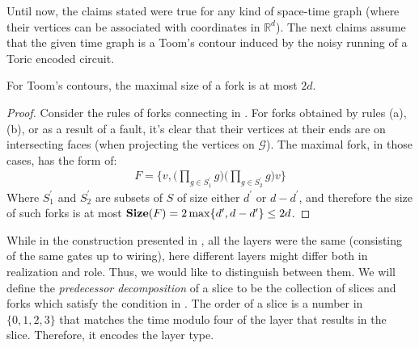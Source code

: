 
Until now, the claims stated were true for any kind of space-time graph (where their vertices can be associated with coordinates in $\mathbb{R}^{d}$). The next claims assume that the given time graph is a Toom's contour induced by the noisy running of a Toric encoded circuit.

\begin{claim}
  \label{claim:maxfork}
  For Toom's contours, the maximal size of a fork is at most $2d$.
\end{claim}
\begin{proof}
Consider the rules of forks connecting in . For forks obtained by rules (a), (b), or as a result of a fault, it's clear that their vertices at their ends are on intersecting faces (when projecting the vertices on $\mathcal{G}$). The maximal fork, in those cases, has the form of:
  \begin{equation*}
    \begin{split}
   F =  \bigl\{ v , \bigl( \prod_{g \in S^{\prime}_{1}} g\bigr) \bigl(  \prod_{g \in S^{\prime}_{2}} g \bigr) v    \bigr\}
    \end{split}
  \end{equation*}
Where $S^{\prime}_{1}$ and $S^{\prime}_{2}$ are subsets of $S$ of size either $d^{\prime}$ or $d - d^{\prime}$, and therefore the size of such forks is at most $\mathbf{Size}(F) = 2 \max \{ d^{\prime}, d - d^{\prime} \} \le 2d$.
\end{proof}



While in the construction presented in \cite{Berman}, all the layers were the same (consisting of the same gates up to wiring), here different layers might differ both in realization and role. Thus, we would like to distinguish between them. We will define the \textit{predecessor decomposition} of a slice to be the collection of slices and forks which satisfy the condition in . The order of a slice is a number in $\{0,1,2,3\}$ that matches the time modulo four of the layer that results in the slice. Therefore, it encodes the layer type.

    

